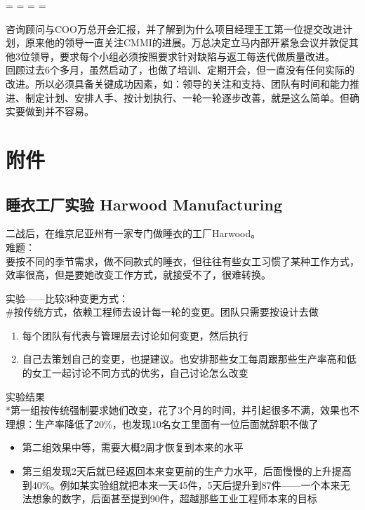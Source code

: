 \begin{description}
\tightlist
\item[]
= = = =
\end{description}

咨询顾问与COO万总开会汇报，并了解到为什么项目经理王工第一位提交改进计划，原来他的领导一直关注CMMI的进展。万总决定立马内部开紧急会议并敦促其他3位领导，要求每个小组必须按照要求针对缺陷与返工每迭代做质量改进。\\

回顾过去6个多月，虽然启动了，也做了培训、定期开会，但一直没有任何实际的改进。所以必须具备关键成功因素，如：领导的关注和支持、团队有时间和能力推进、制定计划、安排人手、按计划执行、一轮一轮逐步改善，就是这么简单。但确实要做到并不容易。

\hypertarget{ux9644ux4ef6}{%
\section{附件}\label{ux9644ux4ef6}}

\hypertarget{ux7761ux8863ux5de5ux5382ux5b9eux9a8c-harwood-manufacturing}{%
\subsection{睡衣工厂实验 Harwood
Manufacturing}\label{ux7761ux8863ux5de5ux5382ux5b9eux9a8c-harwood-manufacturing}}

二战后，在维京尼亚州有一家专门做睡衣的工厂Harwood。\\
难题：\\
要按不同的季节需求，做不同款式的睡衣，但往往有些女工习惯了某种工作方式，效率很高，但是要她改变工作方式，就接受不了，很难转换。

实验------比较3种变更方式：\\
\#按传统方式，依赖工程师去设计每一轮的变更。团队只需要按设计去做

\begin{enumerate}
\tightlist
\item
  每个团队有代表与管理层去讨论如何变更，然后执行
\item
  自己去策划自己的变更，也提建议。也安排那些女工每周跟那些生产率高和低的女工一起讨论不同方式的优劣，自己讨论怎么改变
\end{enumerate}

实验结果\\
*第一组按传统强制要求她们改变，花了3个月的时间，并引起很多不满，效果也不理想：生产率降低了20\%，也发现10名女工里面有一位后面就辞职不做了

\begin{itemize}
\tightlist
\item
  第二组效果中等，需要大概2周才恢复到本来的水平
\item
  第三组发现2天后就已经返回本来变更前的生产力水平，后面慢慢的上升提高到40\%。例如某实验组就把本来一天45件，5天后提升到87件------一个本来无法想象的数字，后面甚至提到90件，超越那些工业工程师本来的目标\\
\end{itemize}

